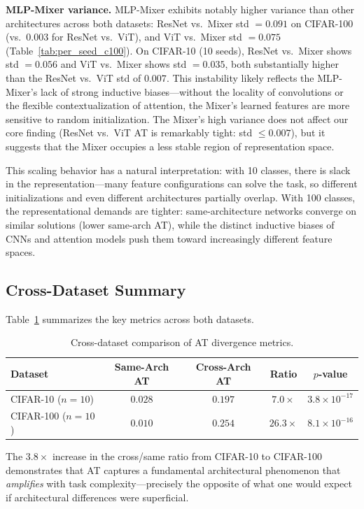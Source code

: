 \documentclass{article}
\begin{document}
\textbf{MLP-Mixer variance.} MLP-Mixer exhibits notably higher variance than other architectures across both datasets: ResNet vs.\ Mixer std $= 0.091$ on CIFAR-100 (vs.\ $0.003$ for ResNet vs.\ ViT), and ViT vs.\ Mixer std $= 0.075$ (Table~\ref{tab:per_seed_c100}). On CIFAR-10 (10 seeds), ResNet vs.\ Mixer shows std $= 0.056$ and ViT vs.\ Mixer shows std $= 0.035$, both substantially higher than the ResNet vs.\ ViT std of $0.007$. This instability likely reflects the MLP-Mixer's lack of strong inductive biases---without the locality of convolutions or the flexible contextualization of attention, the Mixer's learned features are more sensitive to random initialization. The Mixer's high variance does not affect our core finding (ResNet vs.\ ViT AT is remarkably tight: std $\leq 0.007$), but it suggests that the Mixer occupies a less stable region of representation space.

This scaling behavior has a natural interpretation: with 10 classes, there is slack in the representation---many feature configurations can solve the task, so different initializations and even different architectures partially overlap. With 100 classes, the representational demands are tighter: same-architecture networks converge on similar solutions (lower same-arch AT), while the distinct inductive biases of CNNs and attention models push them toward increasingly different feature spaces.

\subsection{Cross-Dataset Summary}

Table~\ref{tab:cross_dataset} summarizes the key metrics across both datasets.

\begin{table}[t]
\caption{Cross-dataset comparison of AT divergence metrics.}
\label{tab:cross_dataset}
\centering
\small
\begin{tabular}{@{}lcccc@{}}
\toprule
Dataset & Same-Arch AT & Cross-Arch AT & Ratio & $p$-value \\
\midrule
CIFAR-10 ($n{=}10$)  & $0.028$ & $0.197$ & $7.0\times$  & $3.8 \times 10^{-17}$ \\
CIFAR-100 ($n{=}10$) & $0.010$ & $0.254$ & $26.3\times$ & $8.1 \times 10^{-16}$ \\
\bottomrule
\end{tabular}
\end{table}

The $3.8\times$ increase in the cross/same ratio from CIFAR-10 to CIFAR-100 demonstrates that AT captures a fundamental architectural phenomenon that \emph{amplifies} with task complexity---precisely the opposite of what one would expect if architectural differences were superficial.
\end{document}
